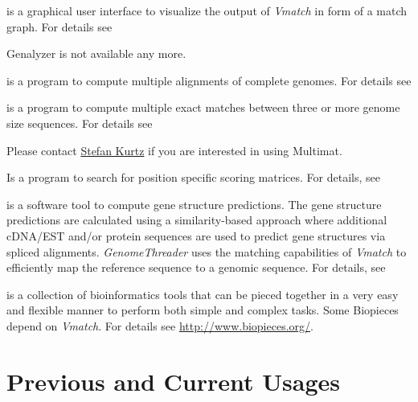 \documentclass[12pt]{article}
\newcommand{\Vmatch}[0]{\textit{Vmatch}\xspace}
\newcommand{\HCode}[1]{}
\begin{document}
\begin{description}
\item[Genalyzer]
is a graphical user interface
to visualize the output of \Vmatch in form of a match graph.
For details see


Genalyzer is not available any more.
\item[\href{http://bibiserv.techfak.uni-bielefeld.de/mga/}{MGA}]
is a program to compute multiple alignments of complete
genomes. For details see

\item[Multimat] is a program to compute multiple exact matches between
three or more genome size sequences. For details see


Please contact
\href{http://www.zbh.uni-hamburg.de/kurtz}{Stefan Kurtz} if you are interested
in using Multimat.

\item[\href{http://bibiserv.techfak.uni-bielefeld.de/possumsearch/}{PossumSearch}]
Is a program to search for position specific scoring matrices.
For details, see

\item
\item[\href{http://www.genomethreader.org/}{GenomeThreader}]
is a software tool to compute gene structure predictions. The gene structure
predictions are calculated using a similarity-based approach where additional
cDNA/EST and/or protein sequences are used to predict gene structures via
spliced alignments. \textit{GenomeThreader} uses the matching capabilities
of \Vmatch to efficiently map the reference sequence to a genomic
sequence. For details, see

\item
\item[\href{http://www.biopieces.org/}{Biopieces}]
is a collection of bioinformatics tools that can be pieced together in a
very easy and flexible manner to perform both simple and complex tasks.
Some Biopieces depend on \Vmatch. For details see
\url{http://www.biopieces.org/}.
\end{description}

\HCode{
<a name="CurrentUsage"/>
}
\section*{Previous and Current Usages}
\end{document}
